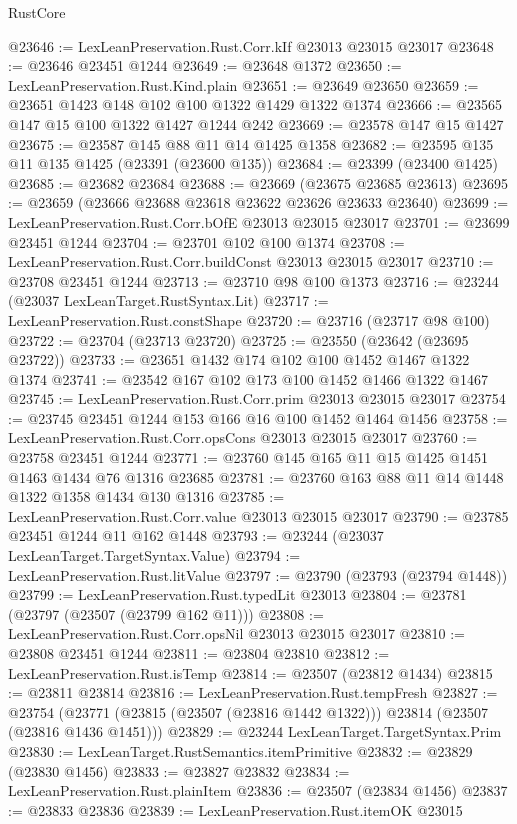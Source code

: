 \begin{lexlean}{RustCore}
\begin{coremodule}
@23646 := LexLeanPreservation.Rust.Corr.kIf @23013 @23015 @23017
@23648 := @23646 @23451 @1244
@23649 := @23648 @1372
@23650 := LexLeanPreservation.Rust.Kind.plain
@23651 := @23649 @23650
@23659 := @23651 @1423 @148 @102 @100 @1322 @1429 @1322 @1374
@23666 := @23565 @147 @15 @100 @1322 @1427 @1244 @242
@23669 := @23578 @147 @15 @1427
@23675 := @23587 @145 @88 @11 @14 @1425 @1358
@23682 := @23595 @135 @11 @135 @1425 (@23391 (@23600 @135))
@23684 := @23399 (@23400 @1425)
@23685 := @23682 @23684
@23688 := @23669 (@23675 @23685 @23613)
@23695 := @23659 (@23666 @23688 @23618 @23622 @23626 @23633 @23640)
@23699 := LexLeanPreservation.Rust.Corr.bOfE @23013 @23015 @23017
@23701 := @23699 @23451 @1244
@23704 := @23701 @102 @100 @1374
@23708 := LexLeanPreservation.Rust.Corr.buildConst @23013 @23015 @23017
@23710 := @23708 @23451 @1244
@23713 := @23710 @98 @100 @1373
@23716 := @23244 (@23037 LexLeanTarget.RustSyntax.Lit)
@23717 := LexLeanPreservation.Rust.constShape
@23720 := @23716 (@23717 @98 @100)
@23722 := @23704 (@23713 @23720)
@23725 := @23550 (@23642 (@23695 @23722))
@23733 := @23651 @1432 @174 @102 @100 @1452 @1467 @1322 @1374
@23741 := @23542 @167 @102 @173 @100 @1452 @1466 @1322 @1467
@23745 := LexLeanPreservation.Rust.Corr.prim @23013 @23015 @23017
@23754 := @23745 @23451 @1244 @153 @166 @16 @100 @1452 @1464 @1456
@23758 := LexLeanPreservation.Rust.Corr.opsCons @23013 @23015 @23017
@23760 := @23758 @23451 @1244
@23771 := @23760 @145 @165 @11 @15 @1425 @1451 @1463 @1434 @76 @1316 @23685
@23781 := @23760 @163 @88 @11 @14 @1448 @1322 @1358 @1434 @130 @1316
@23785 := LexLeanPreservation.Rust.Corr.value @23013 @23015 @23017
@23790 := @23785 @23451 @1244 @11 @162 @1448
@23793 := @23244 (@23037 LexLeanTarget.TargetSyntax.Value)
@23794 := LexLeanPreservation.Rust.litValue
@23797 := @23790 (@23793 (@23794 @1448))
@23799 := LexLeanPreservation.Rust.typedLit @23013
@23804 := @23781 (@23797 (@23507 (@23799 @162 @11)))
@23808 := LexLeanPreservation.Rust.Corr.opsNil @23013 @23015 @23017
@23810 := @23808 @23451 @1244
@23811 := @23804 @23810
@23812 := LexLeanPreservation.Rust.isTemp
@23814 := @23507 (@23812 @1434)
@23815 := @23811 @23814
@23816 := LexLeanPreservation.Rust.tempFresh
@23827 := @23754
    (@23771 (@23815 (@23507 (@23816 @1442 @1322))) @23814 (@23507 (@23816 @1436 @1451)))
@23829 := @23244 LexLeanTarget.TargetSyntax.Prim
@23830 := LexLeanTarget.RustSemantics.itemPrimitive
@23832 := @23829 (@23830 @1456)
@23833 := @23827 @23832
@23834 := LexLeanPreservation.Rust.plainItem
@23836 := @23507 (@23834 @1456)
@23837 := @23833 @23836
@23839 := LexLeanPreservation.Rust.itemOK @23015

\end{coremodule}
\end{lexlean}
